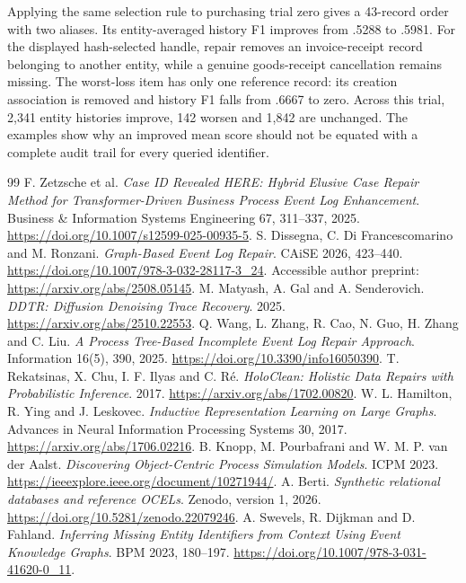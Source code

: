 \documentclass[11pt]{article}
\begin{document}
Applying the same selection rule to purchasing trial zero gives a 43-record order with two aliases. Its entity-averaged history F1 improves from .5288 to .5981. For the displayed hash-selected handle, repair removes an invoice-receipt record belonging to another entity, while a genuine goods-receipt cancellation remains missing. The worst-loss item has only one reference record: its creation association is removed and history F1 falls from .6667 to zero. Across this trial, 2,341 entity histories improve, 142 worsen and 1,842 are unchanged. The examples show why an improved mean score should not be equated with a complete audit trail for every queried identifier.

\clearpage
\begin{thebibliography}{99}
 F. Zetzsche et al. \emph{Case ID Revealed HERE: Hybrid Elusive Case Repair Method for Transformer-Driven Business Process Event Log Enhancement}. Business \& Information Systems Engineering 67, 311--337, 2025. \url{https://doi.org/10.1007/s12599-025-00935-5}.
 S. Dissegna, C. Di Francescomarino and M. Ronzani. \emph{Graph-Based Event Log Repair}. CAiSE 2026, 423--440. \url{https://doi.org/10.1007/978-3-032-28117-3_24}. Accessible author preprint: \url{https://arxiv.org/abs/2508.05145}.
 M. Matyash, A. Gal and A. Senderovich. \emph{DDTR: Diffusion Denoising Trace Recovery}. 2025. \url{https://arxiv.org/abs/2510.22553}.
 Q. Wang, L. Zhang, R. Cao, N. Guo, H. Zhang and C. Liu. \emph{A Process Tree-Based Incomplete Event Log Repair Approach}. Information 16(5), 390, 2025. \url{https://doi.org/10.3390/info16050390}.
 T. Rekatsinas, X. Chu, I. F. Ilyas and C. R\'e. \emph{HoloClean: Holistic Data Repairs with Probabilistic Inference}. 2017. \url{https://arxiv.org/abs/1702.00820}.
 W. L. Hamilton, R. Ying and J. Leskovec. \emph{Inductive Representation Learning on Large Graphs}. Advances in Neural Information Processing Systems 30, 2017. \url{https://arxiv.org/abs/1706.02216}.
 B. Knopp, M. Pourbafrani and W. M. P. van der Aalst. \emph{Discovering Object-Centric Process Simulation Models}. ICPM 2023. \url{https://ieeexplore.ieee.org/document/10271944/}.
 A. Berti. \emph{Synthetic relational databases and reference OCELs}. Zenodo, version 1, 2026. \url{https://doi.org/10.5281/zenodo.22079246}.
 A. Swevels, R. Dijkman and D. Fahland. \emph{Inferring Missing Entity Identifiers from Context Using Event Knowledge Graphs}. BPM 2023, 180--197. \url{https://doi.org/10.1007/978-3-031-41620-0_11}.

\end{thebibliography}
\end{document}
